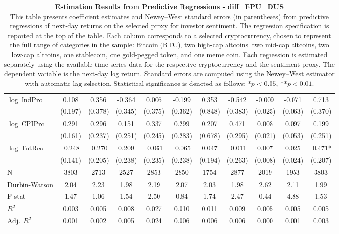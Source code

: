 \begin{table}[ht]
\begin{tabular}{l *{10}{c}}
\addlinespace
$\log\ $IndPro & 0.108 & 0.356 & -0.364 & 0.006 & -0.199 & 0.353 & -0.542 & -0.009 & -0.071 & 0.713 \\
 & (0.197) & (0.378) & (0.345) & (0.375) & (0.362) & (0.848) & (0.383) & (0.025) & (0.063) & (0.370) \\
\addlinespace
$\log\ $CPIPrc & 0.291 & 0.296 & 0.151 & 0.337 & 0.299 & 0.207 & 0.471 & 0.008 & 0.097 & 0.199 \\
 & (0.161) & (0.237) & (0.251) & (0.245) & (0.283) & (0.678) & (0.295) & (0.021) & (0.053) & (0.251) \\
\addlinespace
$\log\ $TotRes & -0.248 & -0.270 & 0.209 & -0.061 & -0.065 & 0.047 & -0.011 & 0.007 & 0.025 & -0.471* \\
 & (0.141) & (0.205) & (0.238) & (0.235) & (0.238) & (0.194) & (0.263) & (0.008) & (0.024) & (0.207) \\
\addlinespace
\midrule
N & 3803 & 2713 & 2527 & 2853 & 2850 & 1754 & 2877 & 2019 & 1953 & 3803 \\
Durbin-Watson & 2.04 & 2.23 & 1.98 & 2.19 & 2.07 & 2.03 & 1.98 & 2.62 & 2.11 & 1.99 \\
F-stat & 1.47 & 1.06 & 1.54 & 2.50 & 0.84 & 1.74 & 2.47 & 0.44 & 4.88 & 1.53 \\
\(R^2\) & 0.003 & 0.005 & 0.008 & 0.027 & 0.010 & 0.011 & 0.009 & 0.005 & 0.005 & 0.005 \\
Adj.\ \(R^2\) & 0.001 & 0.002 & 0.005 & 0.024 & 0.006 & 0.006 & 0.006 & 0.000 & 0.001 & 0.003 \\
\addlinespace
\midrule
\multicolumn{11}{c}{Specification tested: $R_{i,t+1} = \alpha_i + \beta_{sent} S_t + \phi R_{i,t} + \theta B_{i,t} + \gamma M_t + \varepsilon_{i,t+1}$}\\
\bottomrule
\end{tabular}
\caption{\textbf{Estimation Results from Predictive Regressions - diff_EPU_DUS} \\
This table presents coefficient estimates and Newey--West standard errors (in parentheses) from predictive regressions of next-day returns on the selected proxy for investor sentiment. The regression specification is reported at the top of the table. Each column corresponds to a selected cryptocurrency, chosen to represent the full range of categories in the sample: Bitcoin (BTC), two high-cap altcoins, two mid-cap altcoins, two low-cap altcoins, one stablecoin, one gold-pegged token, and one meme coin. Each regression is estimated separately using the available time series data for the respective cryptocurrency and the sentiment proxy. The dependent variable is the next-day log return. Standard errors are computed using the Newey--West estimator with automatic lag selection. Statistical significance is denoted as follows: *$p<0.05$, **$p<0.01$.}
\label{tab:diff_epu_dus_result_h1}
\end{table}